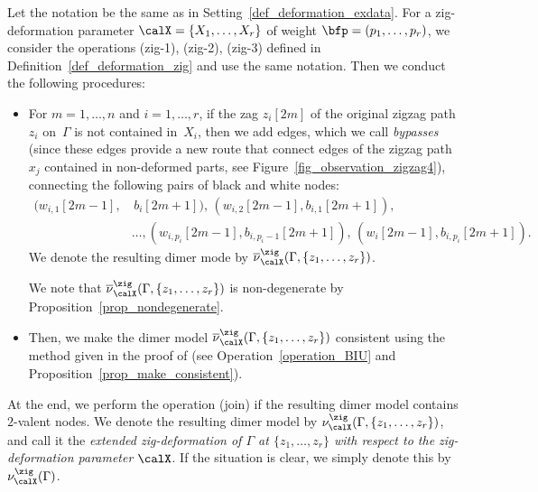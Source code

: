 \begin{Definition}\label{def_exdeformation_zig}
Let the notation be the same as in Setting~\ref{def_deformation_exdata}.
For a zig-deformation parameter $\calX=\{X_1,\dots,X_r\}$ of weight $\bfp=(p_1,\dots,p_r)$, we consider
the operations (zig-1), (zig-2), (zig-3) defined in Definition~\ref{def_deformation_zig} and use the same notation.
Then we conduct the following procedures:
\begin{itemize}\itemsep=0pt
\setlength{\parskip}{0pt}
\setlength{\leftskip}{0.3cm}
\item[(\text{zig}-4)]
For $m=1,\dots,n$ and $i=1, \dots, r$, if the zag $z_i[2m]$ of the original zigzag path~$z_i$ on~$\Gamma$ is not contained in~$X_i$,
then we add edges, which we call \emph{bypasses}
(since these edges provide a new route that connect edges of the zigzag path $x_j$ contained in non-deformed parts, see Figure~\ref{fig_observation_zigzag4}),
connecting the following pairs of black and white nodes:
\begin{align*}
(w_{i,1}[2m-1], &\, b_i[2m+1]), \,(w_{i,2}[2m-1],b_{i,1}[2m+1]), \\ &\dots, (w_{i,p_i}[2m-1],b_{i,p_i-1}[2m+1]),\, (w_i[2m-1],b_{i,p_i}[2m+1]).
\end{align*}
We denote the resulting dimer mode by $\overline{\nu}^\zig_\calX(\Gamma, \{z_1,\dots,z_r\})$.

We note that $\overline{\nu}^\zig_\calX(\Gamma, \{z_1,\dots,z_r\})$ is non-degenerate by Proposition~\ref{prop_nondegenerate}.
\item[(\text{zig}-5)]
Then, we make the dimer model $\overline{\nu}^\zig_\calX(\Gamma, \{z_1,\dots,z_r\})$ consistent using the method given in the proof of \cite[Theorem~1.1]{BIU} (see Operation~\ref{operation_BIU} and Proposition~\ref{prop_make_consistent}).
\end{itemize}

At the end, we perform the operation (join) if the resulting dimer model contains $2$-valent nodes.
We denote the resulting dimer model by $\nu^\zig_\calX(\Gamma, \{z_1,\dots,z_r\})$,
and call it the \emph{extended zig-deformation of $\Gamma$ at $\{z_1,\dots,z_r\}$ with respect to the zig-deformation parameter $\calX$}.
If the situation is clear, we simply denote this by $\nu^\zig_\calX(\Gamma)$.
\end{Definition}

